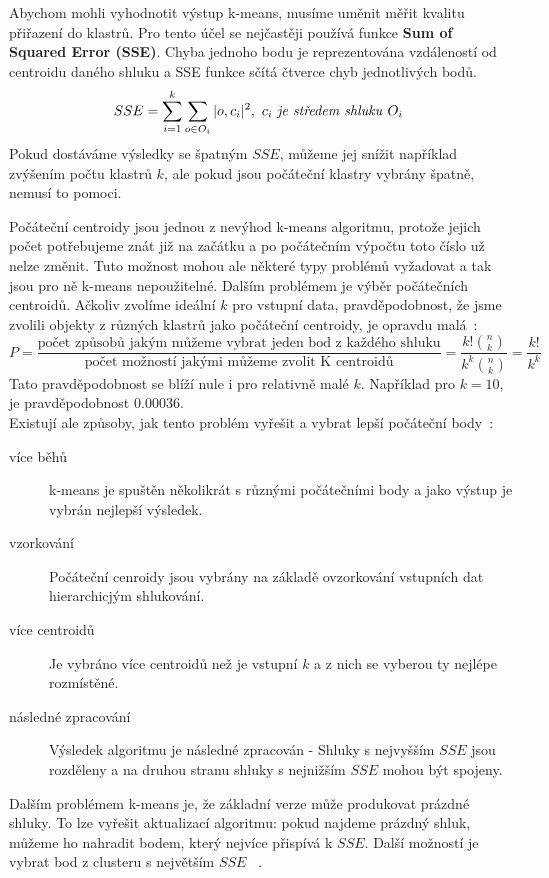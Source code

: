 Abychom mohli vyhodnotit výstup k-means, musíme uměnit měřit kvalitu přiřazení do klastrů. Pro tento účel se nejčastěji používá funkce \textbf{Sum of Squared Error (SSE)}. Chyba jednoho bodu je reprezentována vzdáleností od centroidu daného shluku a SSE funkce sčítá čtverce chyb jednotlivých bodů.
$$SSE = \sum^k_{i=1}\sum_{o \in O_i}|o,c_i|^2, \textrm{ $c_i$ \textit{je středem shluku} $O_i$ }$$
Pokud dostáváme výsledky se špatným $SSE$, můžeme jej snížit například zvýšením počtu klastrů $k$, ale pokud jsou počáteční klastry vybrány špatně, nemusí to pomoci.

Počáteční centroidy jsou jednou z nevýhod k-means algoritmu, protože jejich počet potřebujeme znát již na začátku a po počátečním výpočtu toto číslo už nelze změnit. Tuto možnost mohou ale některé typy problémů vyžadovat a tak jsou pro ně k-means nepoužitelné. Dalším problémem je výběr počátečních centroidů. Ačkoliv zvolíme ideální $k$ pro vstupní data, pravděpodobnost, že jsme zvolili objekty z různých klastrů jako počáteční centroidy, je opravdu malá~\cite{Tan05}: $$P = \frac{\mbox{počet způsobů jakým můžeme vybrat jeden bod z každého shluku}}{\mbox{počet možností jakými můžeme zvolit K centroidů}}=\frac{k!{n \choose k}}{k^k {n \choose k} }=\frac{k!}{k^k}$$ Tato pravděpodobnost se blíží nule i pro relativně malé $k$. Například pro $k=10$, je pravděpodobnost $0.00036$. \\
Existují ale způsoby, jak tento problém vyřešit a vybrat lepší počáteční body~\cite{Tan05}:
\begin{description}
\item[více běhů] k-means je spuštěn několikrát s různými počátečními body a jako výstup je vybrán nejlepší výsledek.
\item[vzorkování] Počáteční cenroidy jsou vybrány na základě ovzorkování vstupních dat hierarchicjým shlukování.
\item[více centroidů] Je vybráno více centroidů než je vstupní $k$ a z nich se vyberou ty nejlépe rozmístěné.
\item[následné zpracování] Výsledek algoritmu je následné zpracován - Shluky s nejvyšším $SSE$ jsou rozděleny a na druhou stranu shluky s nejnižším $SSE$ mohou být spojeny.
\end{description} 

Dalším problémem k-means je, že základní verze může produkovat prázdné shluky. To lze vyřešit aktualizací algoritmu: pokud najdeme prázdný shluk, můžeme ho nahradit bodem, který nejvíce přispívá k $SSE$. Další možností je vybrat bod z clusteru s největším $SSE$ ~\cite{Tan05}.

